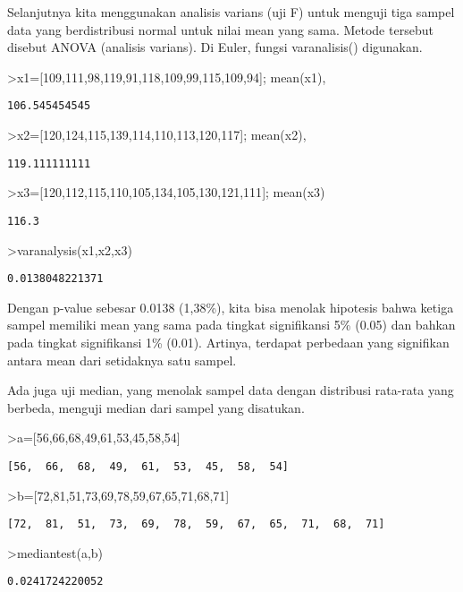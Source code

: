 \documentclass[
]{book}
\begin{document}
Selanjutnya kita menggunakan analisis varians (uji F) untuk menguji tiga sampel data yang berdistribusi normal untuk nilai mean yang sama. Metode tersebut disebut ANOVA (analisis varians). Di Euler, fungsi varanalisis() digunakan.

\textgreater x1={[}109,111,98,119,91,118,109,99,115,109,94{]}; mean(x1),

\begin{verbatim}
106.545454545
\end{verbatim}

\textgreater x2={[}120,124,115,139,114,110,113,120,117{]}; mean(x2),

\begin{verbatim}
119.111111111
\end{verbatim}

\textgreater x3={[}120,112,115,110,105,134,105,130,121,111{]}; mean(x3)

\begin{verbatim}
116.3
\end{verbatim}

\textgreater varanalysis(x1,x2,x3)

\begin{verbatim}
0.0138048221371
\end{verbatim}

Dengan p-value sebesar 0.0138 (1,38\%), kita bisa menolak hipotesis bahwa ketiga sampel memiliki mean yang sama pada tingkat signifikansi 5\% (0.05) dan bahkan pada tingkat signifikansi 1\% (0.01). Artinya, terdapat perbedaan yang signifikan antara mean dari setidaknya satu sampel.

Ada juga uji median, yang menolak sampel data dengan distribusi rata-rata yang berbeda, menguji median dari sampel yang disatukan.

\textgreater a={[}56,66,68,49,61,53,45,58,54{]}

\begin{verbatim}
[56,  66,  68,  49,  61,  53,  45,  58,  54]
\end{verbatim}

\textgreater b={[}72,81,51,73,69,78,59,67,65,71,68,71{]}

\begin{verbatim}
[72,  81,  51,  73,  69,  78,  59,  67,  65,  71,  68,  71]
\end{verbatim}

\textgreater mediantest(a,b)

\begin{verbatim}
0.0241724220052
\end{verbatim}
\end{document}
